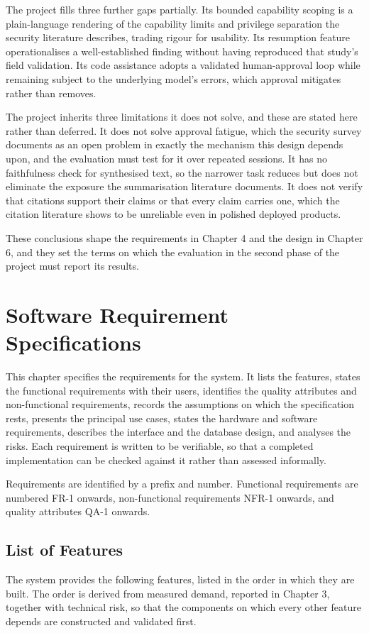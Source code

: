 \documentclass{FastFyp}
\begin{document}
The project fills three further gaps partially. Its bounded capability scoping is a plain-language rendering of the capability limits and privilege separation the security literature describes, trading rigour for usability. Its resumption feature operationalises a well-established finding without having reproduced that study's field validation. Its code assistance adopts a validated human-approval loop while remaining subject to the underlying model's errors, which approval mitigates rather than removes.

The project inherits three limitations it does not solve, and these are stated here rather than deferred. It does not solve approval fatigue, which the security survey documents as an open problem in exactly the mechanism this design depends upon, and the evaluation must test for it over repeated sessions. It has no faithfulness check for synthesised text, so the narrower task reduces but does not eliminate the exposure the summarisation literature documents. It does not verify that citations support their claims or that every claim carries one, which the citation literature shows to be unreliable even in polished deployed products.

These conclusions shape the requirements in Chapter 4 and the design in Chapter 6, and they set the terms on which the evaluation in the second phase of the project must report its results.


\chapter{Software Requirement Specifications}
This chapter specifies the requirements for the system. It lists the features, states the functional requirements with their users, identifies the quality attributes and non-functional requirements, records the assumptions on which the specification rests, presents the principal use cases, states the hardware and software requirements, describes the interface and the database design, and analyses the risks. Each requirement is written to be verifiable, so that a completed implementation can be checked against it rather than assessed informally.

Requirements are identified by a prefix and number. Functional requirements are numbered FR-1 onwards, non-functional requirements NFR-1 onwards, and quality attributes QA-1 onwards.

\section{List of Features}
The system provides the following features, listed in the order in which they are built. The order is derived from measured demand, reported in Chapter 3, together with technical risk, so that the components on which every other feature depends are constructed and validated first.
\end{document}
